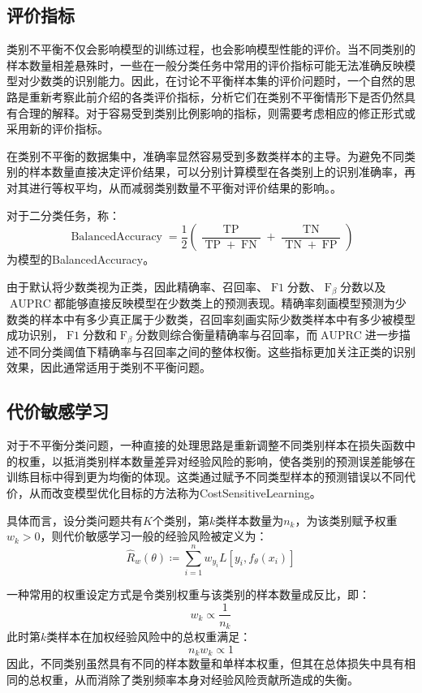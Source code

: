 \subsection{评价指标}
类别不平衡不仅会影响模型的训练过程，也会影响模型性能的评价。当不同类别的样本数量相差悬殊时，一些在一般分类任务中常用的评价指标可能无法准确反映模型对少数类的识别能力。因此，在讨论不平衡样本集的评价问题时，一个自然的思路是重新考察此前介绍的各类评价指标，分析它们在类别不平衡情形下是否仍然具有合理的解释。对于容易受到类别比例影响的指标，则需要考虑相应的修正形式或采用新的评价指标。\par
在类别不平衡的数据集中，准确率显然容易受到多数类样本的主导。为避免不同类别的样本数量直接决定评价结果，可以分别计算模型在各类别上的识别准确率，再对其进行等权平均，从而减弱类别数量不平衡对评价结果的影响。。
\begin{definition}
	对于二分类任务，称：
	\begin{equation*}
		\operatorname{BalancedAccuracy}=\frac{1}{2}\left(\frac{\operatorname{TP}}{\operatorname{TP}+\operatorname{FN}}+\frac{\operatorname{TN}}{\operatorname{TN}+\operatorname{FP}}\right)
	\end{equation*}
	为模型的\gls{BalancedAccuracy}。
\end{definition}
由于默认将少数类视为正类，因此精确率、召回率、$\operatorname{F1}$分数、$\operatorname{F}_{\beta}$分数以及$\operatorname{AUPRC}$都能够直接反映模型在少数类上的预测表现。精确率刻画模型预测为少数类的样本中有多少真正属于少数类，召回率刻画实际少数类样本中有多少被模型成功识别，$\operatorname{F1}$分数和$\operatorname{F}_{\beta}$分数则综合衡量精确率与召回率，而$\operatorname{AUPRC}$进一步描述不同分类阈值下精确率与召回率之间的整体权衡。这些指标更加关注正类的识别效果，因此通常适用于类别不平衡问题。

\subsection{代价敏感学习}
对于不平衡分类问题，一种直接的处理思路是重新调整不同类别样本在损失函数中的权重，以抵消类别样本数量差异对经验风险的影响，使各类别的预测误差能够在训练目标中得到更为均衡的体现。这类通过赋予不同类型样本的预测错误以不同代价，从而改变模型优化目标的方法称为\gls{CostSensitiveLearning}。\par
具体而言，设分类问题共有$K$个类别，第$k$类样本数量为$n_k$，为该类别赋予权重$w_k>0$，则代价敏感学习一般的经验风险被定义为：
\begin{equation*}
	\hat{R}_w(\theta)\coloneq\sum_{i=1}^{n}w_{y_i}L[y_i,f_\theta(x_i)]
\end{equation*}\par
一种常用的权重设定方式是令类别权重与该类别的样本数量成反比，即：
\begin{equation*}
	w_k\propto\frac{1}{n_k}
\end{equation*}
此时第$k$类样本在加权经验风险中的总权重满足：
\begin{equation*}
	n_kw_k\propto1
\end{equation*}
因此，不同类别虽然具有不同的样本数量和单样本权重，但其在总体损失中具有相同的总权重，从而消除了类别频率本身对经验风险贡献所造成的失衡。

